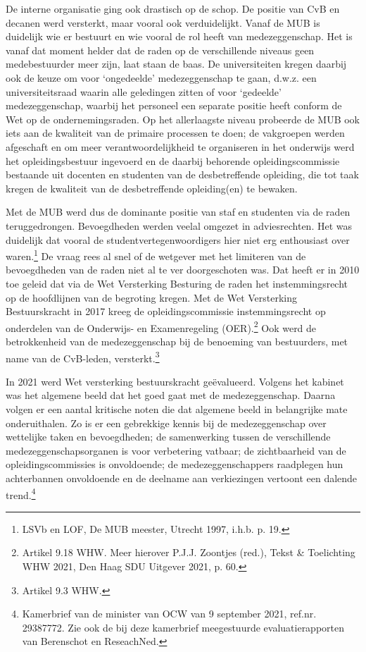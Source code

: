 \documentclass[empirical, authordate, ]{new-jote-article}
\begin{document}
	De interne organisatie ging ook drastisch op de schop. De positie van CvB en decanen werd versterkt, maar vooral ook verduidelijkt. Vanaf de MUB is duidelijk wie er bestuurt en wie vooral de rol heeft van medezeggenschap. Het is vanaf dat moment helder dat de raden op de verschillende niveaus geen medebestuurder meer zijn, laat staan de baas. De universiteiten kregen daarbij ook de keuze om voor ‘ongedeelde' medezeggenschap te gaan, d.w.z. een universiteitsraad waarin alle geledingen zitten of voor ‘gedeelde' medezeggenschap, waarbij het personeel een separate positie heeft conform de Wet op de ondernemingsraden. Op het allerlaagste niveau probeerde de MUB ook iets aan de kwaliteit van de primaire processen te doen; de vakgroepen werden afgeschaft en om meer verantwoordelijkheid te organiseren in het onderwijs werd het opleidingsbestuur ingevoerd en de daarbij behorende opleidingscommissie bestaande uit docenten en studenten van de desbetreffende opleiding, die tot taak kregen de kwaliteit van de desbetreffende opleiding(en) te bewaken.



	Met de MUB werd dus de dominante positie van staf en studenten via de raden teruggedrongen. Bevoegdheden werden veelal omgezet in adviesrechten. Het was duidelijk dat vooral de studentvertegenwoordigers hier niet erg enthousiast over waren.\footnote{LSVb en LOF, De MUB meester, Utrecht 1997, i.h.b. p. 19.} De vraag rees al snel of de wetgever met het limiteren van de bevoegdheden van de raden niet al te ver doorgeschoten was. Dat heeft er in 2010 toe geleid dat via de Wet Versterking Besturing de raden het instemmingsrecht op de hoofdlijnen van de begroting kregen. Met de Wet Versterking Bestuurskracht in 2017 kreeg de opleidingscommissie instemmingsrecht op onderdelen van de Onderwijs- en Examenregeling (OER).\footnote{Artikel 9.18 WHW. Meer hierover P.J.J. Zoontjes (red.), Tekst \& Toelichting WHW 2021, Den Haag SDU Uitgever 2021, p. 60.} Ook werd de betrokkenheid van de medezeggenschap bij de benoeming van bestuurders, met name van de CvB-leden, versterkt.\footnote{Artikel 9.3 WHW.}



	In 2021 werd Wet versterking bestuurskracht geëvalueerd. Volgens het kabinet was het algemene beeld dat het goed gaat met de medezeggenschap. Daarna volgen er een aantal kritische noten die dat algemene beeld in belangrijke mate onderuithalen. Zo is er een gebrekkige kennis bij de medezeggenschap over wettelijke taken en bevoegdheden; de samenwerking tussen de verschillende medezeggenschapsorganen is voor verbetering vatbaar; de zichtbaarheid van de opleidingscommissies is onvoldoende; de medezeggenschappers raadplegen hun achterbannen onvoldoende en de deelname aan verkiezingen vertoont een dalende trend.\footnote{Kamerbrief van de minister van OCW van 9 september 2021, ref.nr. 29387772. Zie ook de bij deze kamerbrief meegestuurde evaluatierapporten van Berenschot en ReseachNed.}
\end{document}
